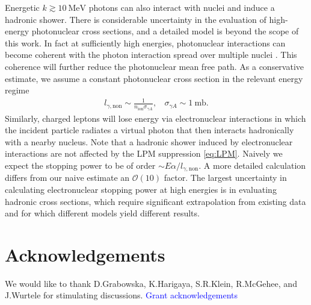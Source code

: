 \documentclass[twocolumn,showpacs,preprintnumbers,amsmath,amssymb,prd]{revtex4}
\newcommand{\OO}{\mathcal{O}}
\begin{document}
\begin{appendices}
Energetic $k \gtrsim 10 ~\text{MeV}$ photons can also interact with nuclei and induce a hadronic shower.
There is considerable uncertainty in the evaluation of high-energy photonuclear cross sections, and a detailed model is beyond the scope of this work.
In fact at sufficiently high energies, photonuclear interactions can become coherent with the photon interaction spread over multiple nuclei \cite{Gerhardt:2010bj}.
This coherence will further reduce the photonuclear mean free path.
As a conservative estimate, we assume a constant photonuclear cross section in the relevant energy regime
\begin{align}
l_{\gamma, \text{non}} \sim \frac{1}{n_\text{ion} \sigma_{\gamma A}}, ~~~~ \sigma_{\gamma A} \sim 1 ~\text{mb}.
\end{align}
Similarly, charged leptons will lose energy via electronuclear interactions in which the incident particle radiates a virtual photon that then interacts hadronically with a nearby nucleus.
Note that a hadronic shower induced by electronuclear interactions are not affected by the LPM suppression \eqref{eq:LPM}.
Naively we expect the stopping power to be of order $\sim E \alpha/l_{\gamma, \text{non}}$.
A more detailed calculation \cite{Gerhardt:2010bj} differs from our naive estimate an $\OO(10)$ factor.
The largest uncertainty in calculating electronuclear stopping power at high energies is in evaluating hadronic cross sections, which require significant extrapolation from existing data and for which different models yield different results.





\end{appendices}

\section*{Acknowledgements}
We would like to thank D.Grabowska, K.Harigaya, S.R.Klein, R.McGehee, and J.Wurtele for stimulating discussions.
\textcolor{blue}{Grant acknowledgements}


\end{document}
